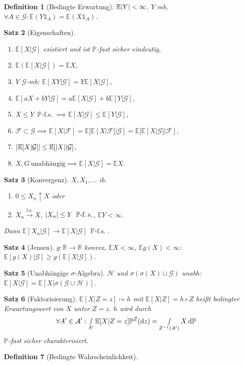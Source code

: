 \documentclass[a4paper,8pt]{article}
\newcounter{Sec}
\theoremstyle{nonumberbreak}
\newtheorem{definition}{Definition}[Sec]
\newtheorem{satz}[definition]{Satz}
\newcommand{\defas}{\coloneqq}
\newcommand{\ind}{\mathds{1}}
\renewcommand{\P}{\mathbb{P}}
\newcommand{\R}{\mathbb{R}}
\newcommand{\E}{\mathbb{E}}
\newcommand{\EV}[2]{\E[#1|#2]}
\newcommand{\BE}[2]{\EV{#1}{\mathcal{#2}}}
\newcommand{\fsk}{\mathrel{\stackrel{\operatorname{f.s.}}{\longrightarrow}}}
\newcommand{\fs}[1]{~\operatorname{#1-f.s.}}
\begin{document}
\begin{multicols}{3}
\begin{definition}[Bedingte Erwartung]
		$\E\abs{Y}<\infty$, $Y$ mb, $\forall A\in\mathcal{G}:\E(Y\ind_A)=\E(X\ind_A)$.
	\end{definition}
	\begin{satz}[Eigenschaften]
		\begin{enumerate}[label=(\alph*)]
			\item $\BE{X}{G}$ existiert und ist $\P$-fast sicher eindeutig,
			\item $\E(\BE{X}{G})=\E X$,
			\item $Y$ $\mathcal{G}$-mb: $\BE{XY}{G}=Y\BE{X}{G}$,
			\item $\BE{aX+bY}{G}=a\BE{X}{G}+b\BE{Y}{G}$,
			\item $X\leq Y\fs{\P}\implies\BE{X}{G}\leq\BE{Y}{G}$,
			\item $\mathcal{F}\subset\mathcal{G}\implies \BE{X}{F}=\BE{\BE{X}{F}}{G}=\BE{\BE{X}{G}}{F}$,
			\item $\abs{\BE{X}{G}}\leq\BE{\abs{X}}{G}$,
			\item $X, G~\text{unabhängig}\implies\BE{X}{G}=\E X$.
		\end{enumerate}
	\end{satz}
	\begin{satz}[Konvergenz]
		$X, X_1,\ldots$ ib.
		\begin{enumerate}[label=(\alph*)]
			\item $0\leq X_n\uparrow X$ oder
			\item $X_n\fsk X$, $\abs{X_n}\leq Y\fs{\P}$, $\E Y<\infty$.
		\end{enumerate}
		Dann $\BE{X_n}{G}\to\BE{X}{G}\fs{\P}$.
	\end{satz}
	\begin{satz}[Jensen]
		$g\colon\R\to\R$ konvex, $\E X<\infty$, $\E g(X)<\infty$: $\BE{g(X)}{G}\geq g(\BE{X}{G})$.
	\end{satz}
	\begin{satz}[Unabhängige $\sigma$-Algebra]
		$\mathcal{H}$ und $\sigma(\sigma(X)\cup\mathcal{G})$ unabh: $\BE{X}{G}=\EV{X}{\sigma(\mathcal{G}\cup\mathcal{H})}$.
	\end{satz}
	\begin{satz}[Faktorisierung]
		$\EV{X}{Z=z}\defas h$ mit $\EV{X}{Z}=h\circ Z$ heißt bedingter Erwartungswert von
		$X$ unter $Z=z$. $h$ wird durch
		\[
			\forall A'\in\mathcal{A}': \smallint_{A'}\EV{X}{Z=z}\P^Z(\dd{z})=\smallint_{Z^{-1}(A')}X\dd{\P}
		\]
		$\P$-fast sicher charakterisiert.
	\end{satz}
	\begin{definition}[Bedingte Wahrscheinlichkeit]

\end{definition}
\end{multicols}
\end{document}
